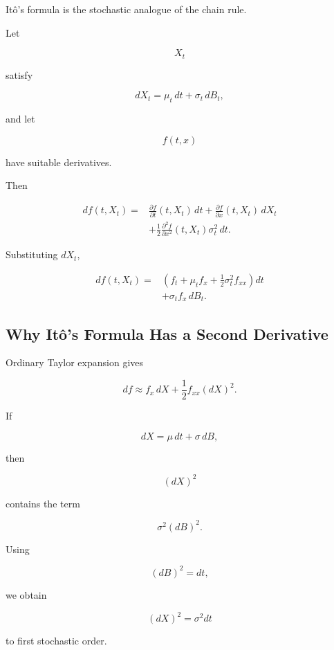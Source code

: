 It\^o's formula is the stochastic analogue of the chain rule.

\begin{theorem}[It\^o's Formula]
Let

\[
X_t
\]

satisfy

\[
dX_t
=
\mu_t\,dt
+
\sigma_t\,dB_t,
\]

and let

\[
f(t,x)
\]

have suitable derivatives.

Then

\[
\boxed{
\begin{aligned}
df(t,X_t)
={}&
\frac{\partial f}{\partial t}(t,X_t)\,dt
+
\frac{\partial f}{\partial x}(t,X_t)\,dX_t
\\
&+
\frac12
\frac{\partial^2 f}{\partial x^2}(t,X_t)
\sigma_t^2\,dt.
\end{aligned}
}
\]
\end{theorem}

Substituting \(dX_t\),

\[
\boxed{
\begin{aligned}
df(t,X_t)
={}&
\left(
f_t
+
\mu_t f_x
+
\frac12\sigma_t^2f_{xx}
\right)dt
\\
&+
\sigma_t f_x\,dB_t.
\end{aligned}
}
\]

\subsection{Why It\^o's Formula Has a Second Derivative}
\label{subsec:why-ito-second-derivative}

Ordinary Taylor expansion gives

\[
df
\approx
f_x\,dX
+
\frac12
f_{xx}(dX)^2.
\]

If

\[
dX
=
\mu\,dt+\sigma\,dB,
\]

then

\[
(dX)^2
\]

contains the term

\[
\sigma^2(dB)^2.
\]

Using

\[
(dB)^2=dt,
\]

we obtain

\[
(dX)^2
=
\sigma^2dt
\]

to first stochastic order.

